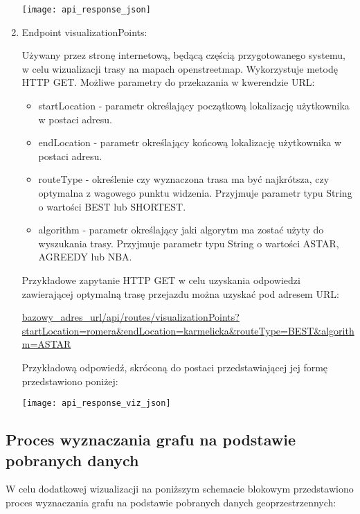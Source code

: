 \begin{enumerate}
\begin{center}
\texttt{[image: api\_response\_json]}
\end{center}

\item Endpoint visualizationPoints:

Używany przez stronę internetową, będącą częścią przygotowanego systemu, w celu wizualizacji trasy na mapach openstreetmap. Wykorzystuje metodę HTTP GET. Możliwe parametry do przekazania w kwerendzie URL:

\begin{itemize}
\item startLocation - parametr określający początkową lokalizację użytkownika w postaci adresu.
\item endLocation - parametr określający końcową lokalizację użytkownika w postaci adresu.
\item routeType - określenie czy wyznaczona trasa ma być najkrótsza, czy optymalna z wagowego punktu widzenia. Przyjmuje parametr typu String o wartości BEST lub SHORTEST.
\item algorithm - parametr określający jaki algorytm ma zostać użyty do wyszukania trasy. Przyjmuje parametr typu String o wartości ASTAR, AGREEDY lub NBA.
\end{itemize}

Przykładowe zapytanie HTTP GET w celu uzyskania odpowiedzi zawierającej optymalną trasę przejazdu można uzyskać pod adresem URL:

\url{bazowy_adres_url/api/routes/visualizationPoints?startLocation=romera&endLocation=karmelicka&routeType=BEST&algorithm=ASTAR}

Przykładową odpowiedź, skróconą do postaci przedstawiającej jej formę przedstawiono poniżej:

\begin{center}
\texttt{[image: api\_response\_viz\_json]}
\end{center}

\end{enumerate}

\subsection{Proces wyznaczania grafu na podstawie pobranych danych}

W celu dodatkowej wizualizacji na poniższym schemacie blokowym przedstawiono proces wyznaczania grafu na podstawie pobranych danych geoprzestrzennych:

